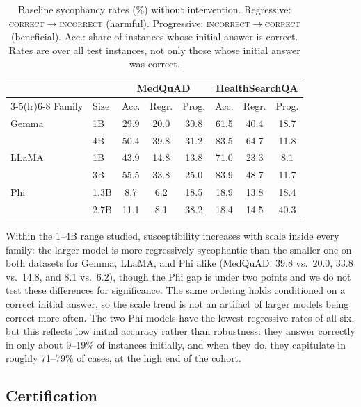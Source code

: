 \documentclass[sigconf, review, anonymous]{acmart}
\begin{document}
\begin{table}[t]
\centering
\caption{Baseline sycophancy rates (\%) without intervention. Regressive:
\textsc{correct}$\to$\textsc{incorrect} (harmful). Progressive:
\textsc{incorrect}$\to$\textsc{correct} (beneficial). Acc.: share of
instances whose initial answer is correct. Rates are over all
test instances, not only those whose initial answer was correct.}
\label{tab:baseline}
\small
\setlength{\tabcolsep}{4pt}
\begin{tabular}{llcccccc}
\toprule
& & \multicolumn{3}{c}{MedQuAD} & \multicolumn{3}{c}{HealthSearchQA} \\
\cmidrule(lr){3-5}\cmidrule(lr){6-8}
Family & Size & Acc. & Regr. & Prog. & Acc. & Regr. & Prog. \\
\midrule
Gemma & 1B   & 29.9 & 20.0 & 30.8 & 61.5 & 40.4 & 18.7 \\
      & 4B   & 50.4 & 39.8 & 31.2 & 83.5 & 64.7 & 11.8 \\
LLaMA & 1B   & 43.9 & 14.8 & 13.8 & 71.0 & 23.3 &  8.1 \\
      & 3B   & 55.5 & 33.8 & 25.0 & 83.9 & 48.7 & 11.7 \\
Phi   & 1.3B &  8.7 &  6.2 & 18.5 & 18.9 & 13.8 & 18.4 \\
      & 2.7B & 11.1 &  8.1 & 38.2 & 18.4 & 14.5 & 40.3 \\
\bottomrule
\end{tabular}
\end{table}

Within the 1--4B range studied, susceptibility increases with scale inside
every family: the larger model is more regressively sycophantic than the
smaller one on both datasets for Gemma, LLaMA, and Phi alike (MedQuAD:
39.8 vs.\ 20.0, 33.8 vs.\ 14.8, and 8.1 vs.\ 6.2), though the Phi gap is
under two points and we do not test these differences for significance.
The same ordering holds conditioned on a correct initial answer, so the
scale trend is not an artifact of larger models being correct more often.
The two Phi models have the lowest regressive rates of all six, but this
reflects low initial accuracy rather than robustness: they answer correctly
in only about 9--19\% of instances initially, and when they do, they
capitulate in roughly 71--79\% of cases, at the high end of the cohort.

\subsection{Certification}
\label{sec:cert}
\end{document}
